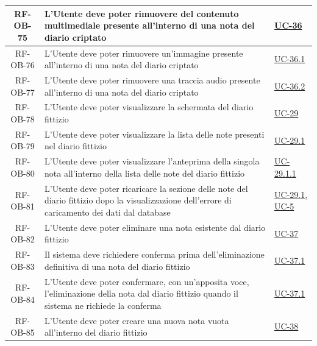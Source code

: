\documentclass[a4paper,12pt]{article}
\begin{document}
\begin{center}
\begin{longtable}{|c|p{8.5cm}|>{\centering\arraybackslash}p{4cm}|}
RF-OB-75 & L'Utente deve poter rimuovere del contenuto multimediale presente all'interno di una nota del diario criptato & \hyperref[subsec:UC-36]{UC-36} \\
\hline

RF-OB-76 & L'Utente deve poter rimuovere un'immagine presente all'interno di una nota del diario criptato & \hyperref[subsec:UC-36.1]{UC-36.1} \\
\hline

RF-OB-77 & L'Utente deve poter rimuovere una traccia audio presente all'interno di una nota del diario criptato & \hyperref[subsec:UC-36.2]{UC-36.2} \\
\hline

RF-OB-78 & L'Utente deve poter visualizzare la schermata del diario fittizio & \hyperref[subsec:UC-29]{UC-29} \\
\hline

RF-OB-79 & L'Utente deve poter visualizzare la lista delle note presenti nel diario fittizio & \hyperref[subsec:UC-29.1]{UC-29.1} \\
\hline

RF-OB-80 & L'Utente deve poter visualizzare l'anteprima della singola nota all'interno della lista delle note del diario fittizio & \hyperref[subsec:UC-29.1.1]{UC-29.1.1} \\
\hline

RF-OB-81 & L'Utente deve poter ricaricare la sezione delle note del diario fittizio dopo la visualizzazione dell'errore di caricamento dei dati dal database & \hyperref[subsec:UC-29.1]{UC-29.1}, \hyperref[sec:UC-5]{UC-5} \\
\hline

RF-OB-82 & L'Utente deve poter eliminare una nota esistente dal diario fittizio & \hyperref[subsec:UC-37]{UC-37} \\
\hline

RF-OB-83 & Il sistema deve richiedere conferma prima dell'eliminazione definitiva di una nota del diario fittizio & \hyperref[subsec:UC-37.1]{UC-37.1} \\
\hline

RF-OB-84 & L'Utente deve poter confermare, con un'apposita voce, l'eliminazione della nota dal diario fittizio quando il sistema ne richiede la conferma & \hyperref[subsec:UC-37.1]{UC-37.1} \\
\hline

RF-OB-85 & L'Utente deve poter creare una nuova nota vuota all'interno del diario fittizio & \hyperref[subsec:UC-38]{UC-38} \\
\hline


\end{longtable}
\end{center}
\end{document}
